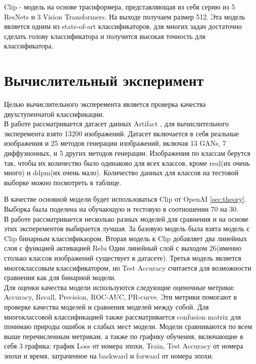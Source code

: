 \documentclass{article}
\begin{document}
Clip - модель на основе траснформера, представляющая из себя серию из 5 ResNets и 3 Vision Transformers. На выходе получаем размер 512. Эта модель является одним из state-of-art классификаторов, для многих задач достаточно сделать голову классификатора и получится высокая точность для классификатора.

\section{Вычислительный эксперимент}
Целью вычислительного эксперемента является проверка качества двухступенчатой классификации. \\

В работе рассматривается датасет данных Artifact \cite{artifact}, для вычислительного эксперемента взято 13200 изображений. Датасет включается в себя реальные изображения и 25 методов генерации изображений, включая 13 GANs, 7 диффузионных, и 5 других методов генерации. Изображения по классам берутся так, чтобы их количество было одинаково для всех классов, кроме real(их очень много) и ddpm(их очень мало). Количество данных для классов на тестовой выборке можно посмотреть в таблице.

В качестве основной модели будет использоваться Clip от OpenAI \ref{sec:theory}.
Выборка была поделена на обучающую и тестовую в соотношении 70 на 30. \\

В работе рассматривается несколько разных моделей для сравнения и на основе этих эксперементов выбирается лучшая. За базовую модель была взята модель с Clip бинарным классификаором. Вторая модель к Clip добавляет два линейных слоя с функцией активацией Relu Один линейный слой с выходом 26(именно столько классов изображений существует в датасете). Третья модель является многоклассовым классификатором, но Test Accuracy считается для возможности сравнения как для бинарной модели. \\

Для оценки качества модели используются следующие оценочные метрики: Accuracy, Recall, Precision, ROC-AUC, PR-curve. Эти метрики помогают в проверке качества моделей и сравнения моделей между собой. Для многоклассовой классификацией также рассматривается confusion matrix для понимаю природы ошибок и слабых мест модели. Модели сравниваются по всем выше перечисленным метрикам, а также по графику обучения, включающие в себя 3 графика: график Loss от номера эпохи, Train, Test Accuracy от номера эпохи и время, затраченное на backward и forward от номера эпохи.\\
\end{document}
